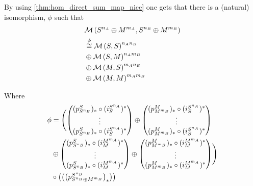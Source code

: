 \begin{remark} \label{rem:big_iso}
    By using \autoref{thm:hom_direct_sum_map_nice} one gets that there is a (natural) isomorphism, \( \phi \) such that
    \begin{align*}
        &{\mathcal{M}}\left( S^{n_A} \oplus M^{m_A}, S^{n_B} \oplus M^{m_B} \right) \\
        &\stackrel{\phi}{\cong} {\mathcal{M}}\left(  S, S  \right)^{n_An_B} \\
        &\oplus {\mathcal{M}}\left(  S, M  \right)^{n_Am_B} \\
        &\oplus {\mathcal{M}}\left(  M, S  \right)^{m_An_B} \\
        &\oplus {\mathcal{M}}\left(  M, M  \right)^{m_Am_B}
    \end{align*}

    Where
    \begin{align*}
        \phi &= \Biggl(
            \begin{pmatrix}
                (p_{S^{n_B}}^S)_* \circ (i_{S}^{S^{n_A}})^* \\
                \vdots \\
                (p_{S^{n_B}}^S)_* \circ (i_{S}^{S^{n_A}})^*
            \end{pmatrix} \oplus \begin{pmatrix}
                (p_{M^{m_B}}^M)_* \circ (i_{S}^{S^{n_A}})^* \\
                \vdots \\
                (p_{M^{m_B}}^M)_* \circ (i_{S}^{S^{n_A}})^*
            \end{pmatrix} \\
            &\oplus \begin{pmatrix}
                (p_{S^{n_B}}^S)_* \circ (i_{M}^{M^{m_A}})^* \\
                \vdots \\
                (p_{S^{n_B}}^S)_* \circ (i_{M}^{M^{m_A}})^*
            \end{pmatrix} \oplus \begin{pmatrix}
                (p_{M^{m_B}}^M)_* \circ (i_{M}^{M^{m_A}})^* \\
                \vdots \\
                (p_{M^{m_B}}^M)_* \circ (i_{M}^{M^{m_A}})^*
            \end{pmatrix}
        \Biggr) \\
        &\circ \left(  
            \begin{pmatrix}
                \left(  p_{S^{n_B} \oplus M^{m_B}}^{S^{n_B}}  \right)_* \\

\end{pmatrix} \right)
\end{align*}
\end{remark}

